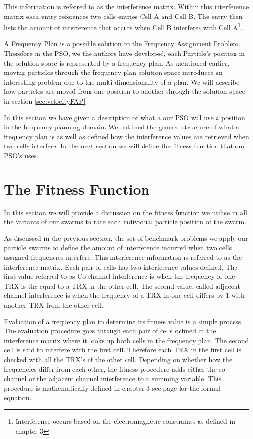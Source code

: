 This information is referred to as the interference matrix. Within this interference matrix each entry references two cells entries Cell A and Cell B. The entry then lists the amount of interference that occurs when Cell B interferes with 
Cell A\footnote{Interference occurs based on the electromagnetic constraints as defined in chapter 3}.

A Frequency Plan is a possible solution to the Frequency Assignment Problem. Therefore in the PSO, we the authors have developed, each Particle's position in the solution space is represented by a frequency plan. As mentioned earlier, moving particles through the frequency plan solution space introduces an interesting problem due to the multi-dimensionality of a plan. We will describe how particles are moved from one position to another through the solution space in section \ref{sec:velocityFAP}

In this section we have given a description of what a our PSO will use a position in the frequency planning domain. We outlined the general structure of what a frequency plan is as well as defined how the interference values are retrieved when
two cells interfere. In the next section we will define the fitness function that our PSO's uses. 
\section{The Fitness Function}
In this section we will provide a discussion on the fitness function we utilise in all the variants of our swarms to rate each individual particle position of the swarm.

As discussed in the previous section, the set of benchmark problems we apply our particle swarms to define the amount of interference incurred when two cells assigned frequencies interfere. This interference information is referred to as 
the interference matrix. Each pair of cells has two interference values defined, The first value referred to as Co-channel interference is when the frequency of one TRX is the equal to a TRX in the other cell. The second value, called 
adjacent channel interference is when the frequency of a TRX in one cell differs by 1 with another TRX from the other cell.

Evaluation of a frequency plan to determine its fitness value is a simple process. The evaluation procedure goes through each pair of cells defined in the interference matrix where it looks up both cells in the frequency plan. The second
cell is said to interfere with the first cell. Therefore each TRX in the first cell is checked with all the TRX's of the other cell. Depending on whether how the frequencies differ from each other, the fitness procedure adds either the
co-channel or the adjacent channel interference to a summing variable. This procedure is mathematically defined in chapter 3 see page \pageref{E:costFunction} for the formal equation. 

